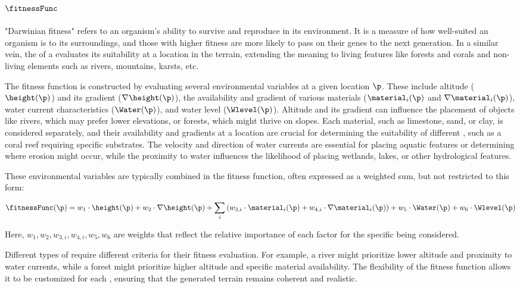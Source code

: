 \subsection{ $\fitnessFunc$}
"Darwinian fitness" refers to an organism's ability to survive and reproduce in its environment. It is a measure of how well-suited an organism is to its surroundings, and those with higher fitness are more likely to pass on their genes to the next generation. In a similar vein, the  of a  evaluates its suitability at a location in the terrain, extending the meaning to living features like forests and corals and non-living elements such as rivers, mountains, karsts, etc.

The fitness function is constructed by evaluating several environmental variables at a given location $\p$. These include altitude ($\height(\p)$) and its gradient ($\nabla \height(\p)$), the availability and gradient of various materials ($\material_i(\p)$ and $\nabla \material_i(\p)$), water current characteristics ($\Water(\p)$), and water level ($\Wlevel(\p)$). Altitude and its gradient can influence the placement of objects like rivers, which may prefer lower elevations, or forests, which might thrive on slopes. Each material, such as limestone, sand, or clay, is considered separately, and their availability and gradients at a location are crucial for determining the suitability of different , such as a coral reef requiring specific substrates. The velocity and direction of water currents are essential for placing aquatic features or determining where erosion might occur, while the proximity to water influences the likelihood of placing wetlands, lakes, or other hydrological features.

These environmental variables are typically combined in the fitness function, often expressed as a weighted sum, but not restricted to this form:

\begin{align*}
    \fitnessFunc(\p) = w_1 \cdot \height(\p) + w_2 \cdot \nabla \height(\p) + \sum_{i} \left( w_{3,i} \cdot \material_i(\p) + w_{4,i} \cdot \nabla \material_i(\p) \right) + w_5 \cdot \Water(\p) + w_6 \cdot \Wlevel(\p)
\end{align*}

Here, $w_1, w_2, w_{3,i}, w_{4,i}, w_5, w_6$ are weights that reflect the relative importance of each factor for the specific  being considered.

Different types of  require different criteria for their fitness evaluation. For example, a river might prioritize lower altitude and proximity to water currents, while a forest might prioritize higher altitude and specific material availability. The flexibility of the fitness function allows it to be customized for each , ensuring that the generated terrain remains coherent and realistic.

